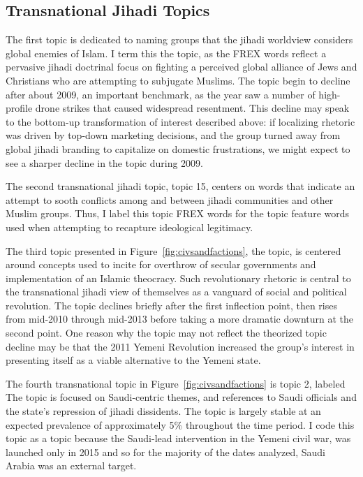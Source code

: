 \subsection{Transnational Jihadi Topics}

The first topic is dedicated to naming groups that
the jihadi worldview considers global enemies of Islam. I term this
the  topic, as the FREX words reflect a
pervasive jihadi doctrinal focus on fighting a perceived global
alliance of Jews and Christians who are attempting to subjugate
Muslims. The  topic begin to decline after
about 2009, an important benchmark, as the year saw a number of
high-profile drone strikes that caused widespread resentment.  This
decline may speak to the bottom-up transformation of interest
described above: if localizing rhetoric was driven by top-down
marketing decisions, and the group turned away from global jihadi
branding to capitalize on domestic frustrations, we might
expect to see a sharper decline in the topic during 2009.

The second transnational jihadi topic, topic 15, centers on words that indicate an attempt to sooth conflicts among and between jihadi communities and other Muslim groups. Thus, I label this topic  FREX words for the topic feature words used when attempting to recapture ideological legitimacy. %

The third topic presented in Figure~\ref{fig:civsandfactions}, the
 topic, is centered around concepts used to
incite for overthrow of secular governments and implementation of an
Islamic theocracy. Such revolutionary rhetoric is central to the
transnational jihadi view of themselves as a vanguard of social and
political revolution.  The topic declines briefly after the first inflection
point, then rises from mid-2010 through mid-2013 before taking a more
dramatic downturn at the second point. One reason why the  topic may not reflect the theorized 
topic decline may be that the 2011 Yemeni Revolution increased the
group's interest in presenting itself as a viable alternative to the
Yemeni state.

The fourth transnational topic in Figure~\ref{fig:civsandfactions} is
topic 2, labeled  The topic is
focused on Saudi-centric themes, and references to Saudi officials and the state's repression
of jihadi dissidents. The topic is largely stable at an expected prevalence of
approximately 5\%  throughout the time period.  I code this topic as a
 topic because the Saudi-lead intervention in the Yemeni
civil war,  was launched only in 2015 and so for the
majority of the dates analyzed, Saudi Arabia was an external target.

